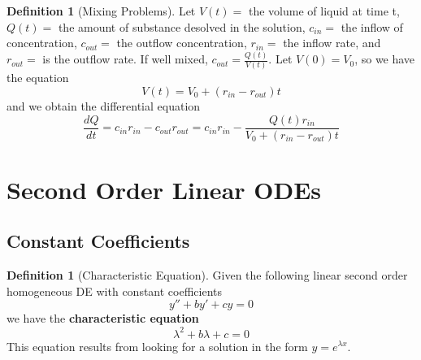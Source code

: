 \documentclass[12pt]{article}
\theoremstyle{definition}
\newtheorem{defn}[thm]{Definition}
\theoremstyle{remark}
\numberwithin{equation}{section}
\newcommand\B[1]{\textbf{ #1}}
\newcommand\diriv[2]{\ensuremath{\frac{d #1}{d #2}}}
\begin{document}
\vspace{1cm}


\begin{defn}[Mixing Problems]
        Let $V(t) = $ the volume of liquid at time t, $Q(t) = $ the amount of substance desolved in the solution, $c_{in} = $ the inflow of concentration, $c_{out} = $ the outflow concentration, $r_{in} = $ the inflow rate, and $r_{out} = $ is the outflow rate. If well mixed, $c_{out} = \frac{Q(t)}{V(t)}$. Let $V(0) = V_0$, so we have the equation \begin{equation}
                V(t) = V_0 + (r_{in} - r_{out})t
        \end{equation}
        and we obtain the differential equation \begin{equation}
                \diriv{Q}{t} = c_{in}r_{in} -c_{out}r_{out} = c_{in}r_{in} - \frac{Q(t)r_{in}}{V_0+(r_{in}-r_{out})t} 
        \end{equation}
\end{defn}

\vspace{1cm}








\clearpage

\section{Second Order Linear ODEs}

\subsection{Constant Coefficients}

\begin{defn}[Characteristic Equation]
        Given the following linear second order homogeneous DE with constant coefficients \begin{equation}
                y'' + by' + cy = 0 
        \end{equation}
        we have the \B{characteristic equation} \begin{equation}
                \lambda^2 + b\lambda + c = 0
        \end{equation}
        This equation results from looking for a solution in the form $y = e^{\lambda x}$.
\end{defn}



\vspace{1cm}
\end{document}
